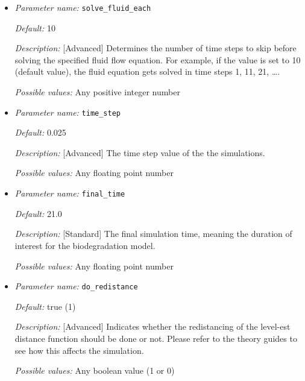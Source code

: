 \begin{itemize}
{\it Possible values:} Any boolean value (1 or 0)


\item {\it Parameter name:} {\tt solve\_fluid\_each}
\label{parameters:solve_fluid_each}


{\it Default:} 10

{\it Description:} [Advanced] Determines the number of time steps to skip before solving the specified fluid flow equation. For example, if the value is set to 10 (default value), the fluid equation gets solved in time steps 1, 11, 21, \ldots.

{\it Possible values:} Any positive integer number


\item {\it Parameter name:} {\tt time\_step}
\label{parameters:time_step}


{\it Default:} 0.025

{\it Description:} [Advanced] The time step value of the the simulations.

{\it Possible values:} Any floating point number


\item {\it Parameter name:} {\tt final\_time}
\label{parameters:final_time}


{\it Default:} 21.0

{\it Description:} [Standard] The final simulation time, meaning the duration of interest for the biodegradation model.

{\it Possible values:} Any floating point number


\item {\it Parameter name:} {\tt do\_redistance}
\label{parameters:do_redistance}


{\it Default:} true (1)

{\it Description:} [Advanced] Indicates whether the redistancing of the level-est distance function should be done or not. Please refer to the theory guides to see how this affects the simulation.

{\it Possible values:} Any boolean value (1 or 0)



\end{itemize}
